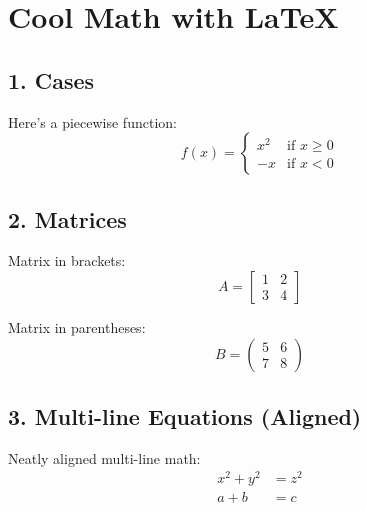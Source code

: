 \documentclass{article}
\begin{document}
\section*{Cool Math with LaTeX}

\subsection*{1. Cases}
Here's a piecewise function:
\[
f(x) =
\begin{cases}
  x^2 & \text{if } x \geq 0 \\
  -x  & \text{if } x < 0
\end{cases}
\]

\subsection*{2. Matrices}
Matrix in brackets:
\[
A =
\begin{bmatrix}
  1 & 2 \\
  3 & 4
\end{bmatrix}
\]

Matrix in parentheses:
\[
B =
\begin{pmatrix}
  5 & 6 \\
  7 & 8
\end{pmatrix}
\]

\subsection*{3. Multi-line Equations (Aligned)}
Neatly aligned multi-line math:
\[
\begin{aligned}
  x^2 + y^2 &= z^2 \\
  a + b     &= c
\end{aligned}
\]
\end{document}
